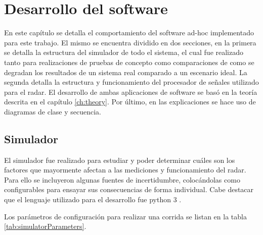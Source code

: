 \chapter{Desarrollo del software} \label{ch:softwareDevelopment}

\ifpdf
    \graphicspath{{Chapter4/Figs/Raster/}{Chapter4/Figs/PDF/}{Chapter4/Figs/}}
\else
    \graphicspath{{Chapter4/Figs/Vector/}{Chapter4/Figs/}}
\fi

En este capítulo se detalla el comportamiento del software ad-hoc implementado para este trabajo. El mismo se encuentra dividido en dos secciones, en la primera se detalla la estructura del simulador de todo el sistema, el cual fue realizado tanto para realizaciones de pruebas de concepto como comparaciones de como se degradan los resultados de un sistema real comparado a un escenario ideal. La segunda detalla la estructura y funcionamiento del procesador de señales utilizado para el radar. El desarrollo de ambas aplicaciones de software se basó en la teoría descrita en el capítulo \ref{ch:theory}. Por último, en las explicaciones se hace uso de diagramas de clase y secuencia.


\section{Simulador}

El simulador fue realizado para estudiar y poder determinar cuáles son los factores que mayormente afectan a las mediciones y funcionamiento del radar. Para ello se incluyeron algunas fuentes de incertidumbre, colocándolas como configurables para ensayar sus consecuencias de forma individual. Cabe destacar que el lenguaje utilizado para el desarrollo fue python 3 \cite{python3}.

Los parámetros de configuración para realizar una corrida se listan en la tabla \ref{tab:simulatorParameters}.

